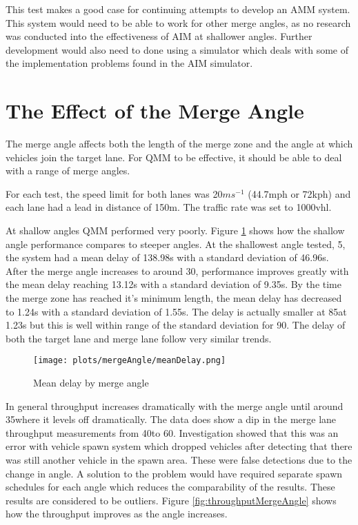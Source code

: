 This test makes a good case for continuing attempts to develop an AMM system. This system would need to be able to work for other merge angles, as no research was conducted into the effectiveness of AIM at shallower angles. Further development would also need to done using a simulator which deals with some of the implementation problems found in the AIM simulator.

\section{The Effect of the Merge Angle}
\label{sec:The Effect of the Merge Angle}
The merge angle affects both the length of the merge zone and the angle at which vehicles join the target lane. For QMM to be effective, it should be able to deal with a range of merge angles.

For each test, the speed limit for both lanes was 20$\si{ms^{-1}}$ (44.7\si{mph} or 72\si{kph}) and each lane had a lead in distance of 150\si{m}. The traffic rate was set to 1000\si{vhl}.

At shallow angles QMM performed very poorly. Figure \ref{fig:meanDelayMergeAngle} shows how the shallow angle performance compares to steeper angles. At the shallowest angle tested, 5\degree, the system had a mean delay of 138.98\si{s} with a standard deviation of 46.96\si{s}. After the merge angle increases to around 30\degree, performance improves greatly with the mean delay reaching 13.12\si{s} with a standard deviation of 9.35\si{s}. By the time the merge zone has reached it's minimum length, the mean delay has decreased to 1.24\si{s} with a standard deviation of 1.55\si{s}. The delay is actually smaller at 85\degree at 1.23\si{s} but this is well within range of the standard deviation for 90\degree. The delay of both the target lane and merge lane follow very similar trends. 

\begin{figure}[htb]
\centering
\texttt{[image: plots/mergeAngle/meanDelay.png]}
\caption{Mean delay by merge angle}
\label{fig:meanDelayMergeAngle}
\end{figure}

In general throughput increases dramatically with the merge angle until around 35\degree where it levels off dramatically. The data does show a dip in the merge lane throughput measurements from 40\degree to 60\degree. Investigation showed that this was an error with vehicle spawn system which dropped vehicles after detecting that there was still another vehicle in the spawn area. These were false detections due to the change in angle. A solution to the problem would have required separate spawn schedules for each angle which reduces the comparability of the results. These results are considered to be outliers. Figure \ref{fig:throughputMergeAngle} shows how the throughput improves as the angle increases.

